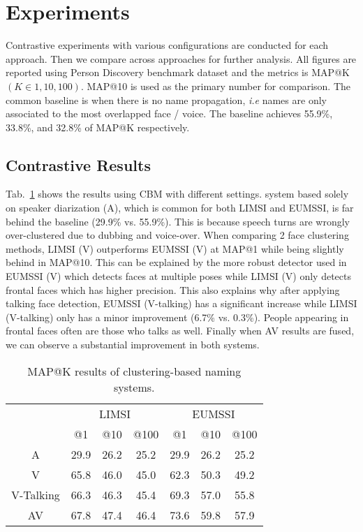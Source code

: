 \section{Experiments}
\label{sec:experiment}

Contrastive experiments with various configurations are conducted for each approach. Then we compare across approaches for further analysis. All figures are reported using Person Discovery benchmark dataset and the metrics is MAP@K $(K \in {1, 10, 100})$. MAP@10 is used as the primary number for comparison.
%
The common baseline is when there is no name propagation, \emph{i.e} names are only associated to the most overlapped face / voice. The baseline achieves 55.9\%, 33.8\%, and 32.8\% of MAP@K respectively.

\subsection{Contrastive Results}

 Tab.~\ref{tab:clustering} shows the results using CBM with different settings. system based solely on speaker diarization (A), which is common for both LIMSI and EUMSSI, is far behind the baseline (29.9\% vs. 55.9\%). This is because speech turns are wrongly over-clustered due to dubbing and voice-over.
%
When comparing 2 face clustering methods, LIMSI (V) outperforms EUMSSI (V) at MAP@1 while being slightly behind in MAP@10. This can be explained by the more robust detector used in EUMSSI (V) which detects faces at multiple poses while LIMSI (V) only detects frontal faces which has higher precision.
%
This also explains why after applying talking face detection, EUMSSI (V-talking) has a significant increase while LIMSI (V-talking) only has a minor improvement (6.7\% vs. 0.3\%). People appearing in frontal faces often are those who talks as well.
%
Finally when AV results are fused, we can observe a substantial improvement in both systems.

\begin{table}[tb]
\centering
\caption{MAP@K results of clustering-based naming systems.}
\vspace*{-2mm}
\begin{tabular}{c|c|c|c|| c|c|c|}
\cline{2-7}
  &  \multicolumn{3}{|c||}{LIMSI} &  \multicolumn{3}{|c|}{EUMSSI} \\ \cline{2-7}
           & @1& @10& @100   & @1& @10& @100 \\ \hline
 \multicolumn{1}{|c|}{A} & 29.9   & 26.2   & 25.2  & 29.9   & 26.2   & 25.2\\ \hline
 \multicolumn{1}{|c|}{V} & 65.8   & 46.0   & 45.0 & 62.3   & 50.3   & 49.2 \\ \hline
 \multicolumn{1}{|c|}{V-Talking} & 66.3   & 46.3   & 45.4 & 69.3   & 57.0   & 55.8 \\ \hline
 \multicolumn{1}{|c|}{AV} & 67.8   & 47.4   & 46.4 & 73.6   & 59.8   & 57.9\\ \hline
\end{tabular}
%
\vspace*{-5mm}
\label{tab:clustering}
\end{table}


